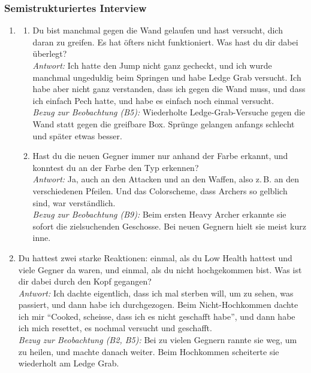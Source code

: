 \documentclass[../Main.tex]{subfiles}
\begin{document}
\subsubsection{Semistrukturiertes Interview}

\begin{enumerate}[label=\textbf{I\arabic*}, leftmargin=1.5cm, itemsep=1em]
\item
\begin{enumerate}[label=\alph*), itemsep=0.6em]
    \item Du bist manchmal gegen die Wand gelaufen und hast versucht, dich daran zu greifen. Es hat öfters nicht funktioniert. Was hast du dir dabei überlegt? \\
        \textit{Antwort:} Ich hatte den Jump nicht ganz gecheckt, und ich wurde manchmal ungeduldig beim Springen und habe Ledge Grab versucht. Ich habe aber nicht ganz verstanden, dass ich gegen die Wand muss, und dass ich einfach Pech hatte, und habe es einfach noch einmal versucht. \\
        \textit{Bezug zur Beobachtung (B5):} Wiederholte Ledge-Grab-Versuche gegen die Wand statt gegen die greifbare Box. Sprünge gelangen anfangs schlecht und später etwas besser.
    \item Hast du die neuen Gegner immer nur anhand der Farbe erkannt, und konntest du an der Farbe den Typ erkennen? \\
        \textit{Antwort:} Ja, auch an den Attacken und an den Waffen, also z.\,B. an den verschiedenen Pfeilen. Und das Colorscheme, dass Archers so gelblich sind, war verständlich. \\
        \textit{Bezug zur Beobachtung (B9):} Beim ersten Heavy Archer erkannte sie sofort die zielsuchenden Geschosse. Bei neuen Gegnern hielt sie meist kurz inne.
\end{enumerate}

\item Du hattest zwei starke Reaktionen: einmal, als du Low Health hattest und viele Gegner da waren, und einmal, als du nicht hochgekommen bist. Was ist dir dabei durch den Kopf gegangen? \\
\textit{Antwort:} Ich dachte eigentlich, dass ich mal sterben will, um zu sehen, was passiert, und dann habe ich durchgezogen. Beim Nicht-Hochkommen dachte ich mir \enquote{Cooked, scheisse, dass ich es nicht geschafft habe}, und dann habe ich mich resettet, es nochmal versucht und geschafft. \\
\textit{Bezug zur Beobachtung (B2, B5):} Bei zu vielen Gegnern rannte sie weg, um zu heilen, und machte danach weiter. Beim Hochkommen scheiterte sie wiederholt am Ledge Grab.


\end{enumerate}
\end{document}
